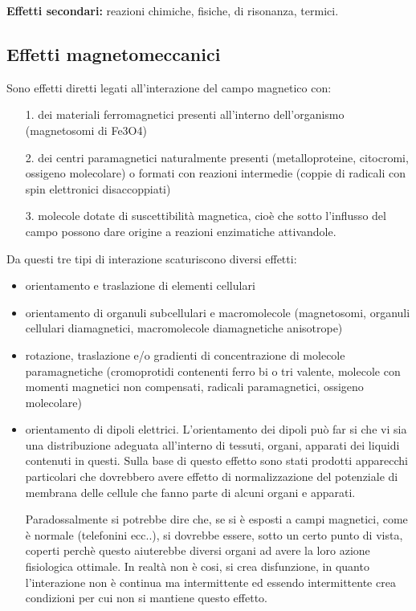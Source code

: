 \textbf{Effetti secondari:} reazioni chimiche, fisiche, di risonanza,
termici.

\subsection{Effetti magnetomeccanici }

Sono effetti diretti legati all'interazione del campo magnetico con:

\begin{itemize}
\item[1.]
  dei materiali ferromagnetici presenti all'interno dell'organismo
  (magnetosomi di Fe3O4)
\item[2.]
  dei centri paramagnetici naturalmente presenti (metalloproteine,
  citocromi, ossigeno molecolare) o formati con reazioni intermedie
  (coppie di radicali con spin elettronici disaccoppiati)
\item[3.]
  molecole dotate di suscettibilità magnetica, cioè che sotto l'influsso
  del campo possono dare origine a reazioni enzimatiche attivandole.
\end{itemize}

Da questi tre tipi di interazione scaturiscono diversi effetti:

\begin{itemize}
\item
  orientamento e traslazione di elementi cellulari
\item
  orientamento di organuli subcellulari e macromolecole (magnetosomi,
  organuli cellulari diamagnetici, macromolecole diamagnetiche
  anisotrope)
\item
  rotazione, traslazione e/o gradienti di concentrazione di molecole
  paramagnetiche (cromoprotidi contenenti ferro bi o tri valente,
  molecole con momenti magnetici non compensati, radicali paramagnetici,
  ossigeno molecolare)
\item
  orientamento di dipoli elettrici. L'orientamento dei dipoli può far si
  che vi sia una distribuzione adeguata all'interno di tessuti, organi,
  apparati dei liquidi contenuti in questi. Sulla base di questo effetto
  sono stati prodotti apparecchi particolari che dovrebbero avere
  effetto di normalizzazione del potenziale di membrana delle cellule
  che fanno parte di alcuni organi e apparati.

Paradossalmente si potrebbe dire che, se si è esposti a campi magnetici,
come è normale (telefonini ecc..), si dovrebbe essere, sotto un certo
punto di vista, coperti perchè questo aiuterebbe diversi organi ad avere
la loro azione fisiologica ottimale. In realtà non è cosi, si crea
disfunzione, in quanto l'interazione non è continua ma intermittente ed
essendo intermittente crea condizioni per cui non si mantiene questo
effetto.
\end{itemize}

